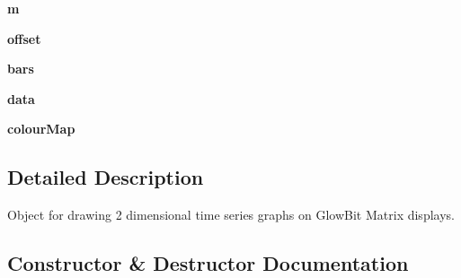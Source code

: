 \begin{DoxyCompactItemize}
{\bfseries m}
\item 
\mbox{\label{classglowbit_1_1glowbitMatrix_1_1graph2D_ac8cfe4f990570e96ee4afd5d9400371b}} 
{\bfseries offset}
\item 
\mbox{\label{classglowbit_1_1glowbitMatrix_1_1graph2D_a3dc420308e355151a6e6d1943a473a94}} 
{\bfseries bars}
\item 
\mbox{\label{classglowbit_1_1glowbitMatrix_1_1graph2D_a5a11fc642d5ad79ab08e5d806b0bab77}} 
{\bfseries data}
\item 
\mbox{\label{classglowbit_1_1glowbitMatrix_1_1graph2D_a116e7d95ab5e0b13ea8f57582bfa15e4}} 
{\bfseries colour\+Map}
\end{DoxyCompactItemize}


\subsection{Detailed Description}
Object for drawing 2 dimensional time series graphs on Glow\+Bit Matrix displays. 



\subsection{Constructor \& Destructor Documentation}
\mbox{\label{classglowbit_1_1glowbitMatrix_1_1graph2D_a6250b96918df343764c1bc268a6e813b}} 
